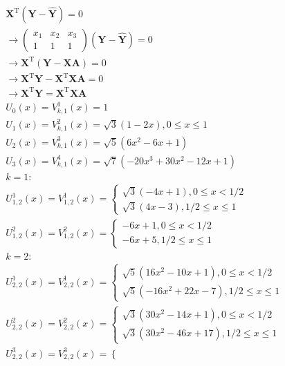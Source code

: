 \documentclass{article}
\begin{document}
\begin{equation}
\begin{aligned}
        \mathbf{X}^\mathrm{T}(\mathbf{Y}-\mathbf{\hat{Y}})=0\\
        \to \begin{pmatrix}
            x_1&x_2&x_3\\
            1&1&1
        \end{pmatrix}(\mathbf{Y}-\mathbf{\hat{Y}})=0\\
        \to \mathbf{X}^\mathrm{T}(\mathbf{Y}-\mathbf{XA})=0\\
        \to \mathbf{X}^\mathrm{T}\mathbf{Y}-\mathbf{X}^\mathrm{T}\mathbf{XA}=0\\
        \to \mathbf{X}^\mathrm{T}\mathbf{Y}=\mathbf{X}^\mathrm{T}\mathbf{XA}\\
        U_0(x)=V_{k,1}^1(x)=1\\
        U_1(x)=V_{k,1}^2(x)=\sqrt{3}(1-2x),0\leq x\leq 1\\
        U_2(x)=V_{k,1}^3(x)=\sqrt{5}(6x^2-6x+1)\\
        U_3(x)=V_{k,1}^4(x)=\sqrt{7}(-20x^3+30x^2-12x+1)\\
        k=1:\\
        U_{1,2}^1(x)=V_{1,2}^1(x)=\left\{\begin{matrix}
        \sqrt3(-4x+1), 0\leq x< 1/2\\ 
        \sqrt3(4x-3), 1/2\leq x\leq 1
        \end{matrix}\right.\\
        U_{1,2}^2(x)=V_{1,2}^2(x)=\left\{\begin{matrix}
        -6x+1,0\leq x< 1/2\\ 
        -6x+5, 1/2\leq x\leq 1
        \end{matrix}\right.\\
        k=2:\\
        U_{2,2}^1(x)=V_{2,2}^1(x)=\left\{\begin{matrix}
        \sqrt5(16x^2-10x+1), 0\leq x< 1/2\\ 
        \sqrt5(-16x^2+22x-7), 1/2\leq x\leq 1
        \end{matrix}\right.\\
        U_{2,2}^2(x)=V_{2,2}^2(x)=\left\{\begin{matrix}
        \sqrt3(30x^2-14x+1), 0\leq x< 1/2\\ 
        \sqrt3(30x^2-46x+17), 1/2\leq x\leq 1
        \end{matrix}\right.\\
        U_{2,2}^3(x)=V_{2,2}^3(x)=\left\{\begin{matrix}

\end{matrix}
\end{aligned}
\end{equation}
\end{document}
